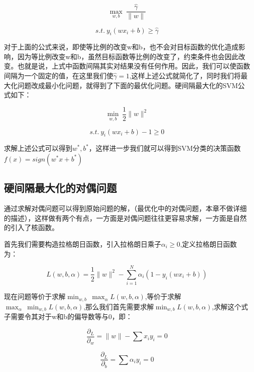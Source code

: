 	\begin{equation}
		\max_{w,b}\ \frac{\hat{\gamma}}{\|w\|}
	\end{equation}
	
	\begin{equation}
		s.t.\ y_i(wx_i+b) \geq \hat{\gamma}
	\end{equation}
	
	对于上面的公式来说，即使等比例的改变w和b，也不会对目标函数的优化造成影响，因为等比例改变w和b，虽然目标函数等比例的改变了，约束条件也会因此改变。也就是说，上式中函数间隔其实对结果没有任何作用。因此，我们可以使函数间隔为一个固定的值，在这里我们使$\hat{\gamma} = 1$,这样上述公式就简化了，同时我们将最大化问题改成最小化问题，就得到了下面的最优化问题。硬间隔最大化的SVM公式如下：
		
	\begin{equation}
		\min_{w,b}\ \frac{1}{2}\|w\|^{2}
	\end{equation}
	
	\begin{equation}
		s.t.\ y_i(wx_i+b) -1 \geq 0
	\end{equation}
	
	求解上述公式可以得到$w^*,b^*$，这样进一步我们就可以得到SVM分类的决策函数$f(x) = sign(w^*x+b^*)$
	
	\subsection{硬间隔最大化的对偶问题}
	通过求解对偶问题可以得到原始问题的解，（最优化中的对偶问题，本章不做详细的描述），这样做有两个有点，一方面是对偶问题往往更容易求解，一方面是自然的引入了核函数。
	
	首先我们需要构造拉格朗日函数，引入拉格朗日乘子$\alpha_i \geq 0$,定义拉格朗日函数为：
	
	\begin{equation}
	L(w,b,\alpha) = \frac{1}{2}\|w\|^2-\sum_{i=1}^{N}\alpha_i(1-y_i(wx_i+b))
	\end{equation}
	
	现在问题等价于求解$\min_{w,b}\ \max_{\alpha} L(w,b,\alpha)$,等价于求解$\max_{\alpha} \ \min_{w,b} L(w,b,\alpha)$,那么我们首先需要求解$\min_{w,b} L(w,b,\alpha)$,求解这个式子需要令其对于w和b的偏导数等与0，即：
	
	\begin{equation}
		\frac{\partial_L}{\partial_w}=\|w\| - \sum x_i y_i = 0
	\end{equation}

	\begin{equation}
		\frac{\partial_L}{\partial_b}=\sum \alpha_i y_i = 0
	\end{equation}
	

